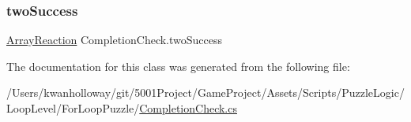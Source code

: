 \mbox{\label{class_completion_check_a565266c6464718da6c52d813c3b0ff32}} 
\subsubsection{\texorpdfstring{two\+Success}{twoSuccess}}
{\footnotesize\ttfamily \hyperlink{class_array_reaction}{Array\+Reaction} Completion\+Check.\+two\+Success}



The documentation for this class was generated from the following file\+:\begin{DoxyCompactItemize}
\item 
/\+Users/kwanholloway/git/5001\+Project/\+Game\+Project/\+Assets/\+Scripts/\+Puzzle\+Logic/\+Loop\+Level/\+For\+Loop\+Puzzle/\hyperlink{_completion_check_8cs}{Completion\+Check.\+cs}\end{DoxyCompactItemize}
